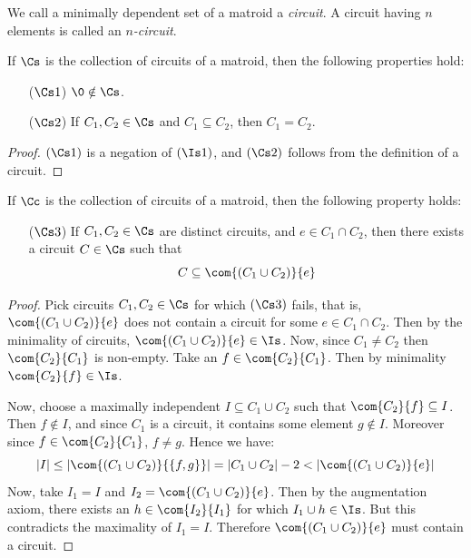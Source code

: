 \begin{definition}
  We call a minimally dependent set of a matroid a \textit{circuit}. A
  circuit having $n$ elements is called an \textit{$n$-circuit}.
\end{definition}

\begin{proposition}\label{proposition_1.1.2}
  If $\Cs$ is the collection of circuits of a matroid, then the
  following properties hold:
  \begin{enumerate}
    \item[($\Cs1$)] $\0 \notin \Cs$.

    \item[($\Cs2$)] If $C_1, C_2 \in \Cs$ and $C_1 \subseteq C_2$,
      then $C_1=C_2$.
  \end{enumerate}
\end{proposition}
\begin{proof}
  $(\Cs1)$ is a negation of $(\Is1)$, and $(\Cs2)$ follows from the
  definition of a circuit.
\end{proof}

\begin{proposition}\label{proposition_1.1.3}
  If $\Cc$ is the collection of circuits of a matroid, then the
  following property holds:
  \begin{enumerate}
    \item[($\Cs3$)] If $C_1,C_2 \in \Cs$ are distinct circuits, and $e
      \in C_1 \cap C_2$, then there exists a circuit $C \in \Cs$ such
      that
      \begin{equation*}
        C \subseteq \com{(C_1 \cup C_2)}{e}
      \end{equation*}
  \end{enumerate}
\end{proposition}
\begin{proof}
  Pick circuits $C_1,C_2 \in \Cs$ for which $(\Cs3)$ fails, that is,
  $\com{(C_1 \cup C_2)}{e}$ does not contain a circuit for some $e \in
  C_1 \cap C_2$. Then by the minimality of circuits, $\com{(C_1 \cup
  C_2)}{e} \in \Is$. Now, since $C_1 \neq C_2$ then $\com{C_2}{C_1}$
  is non-empty. Take an $f \in \com{C_2}{C_1}$. Then by minimality
  $\com{C_2}{f} \in \Is$.

  Now, choose a maximally independent $I \subseteq C_1 \cup C_2$ such
  that $\com{C_2}{f} \subseteq I$. Then $f \notin I$, and since $C_1$
  is a circuit, it contains some element $g \notin I$. Moreover since
  $f \in \com{C_2}{C_1}$, $f \neq g$. Hence we have:
  \begin{equation*}
    |I| \leq |\com{(C_1 \cup C_2)}{\{f,g\}}|=|C_1 \cup C_2|-2<|\com{(C_1 \cup C_2)}{e}|
  \end{equation*}
  Now, take $I_1=I$ and $I_2=\com{(C_1 \cup C_2)}{e}$. Then by the
  augmentation axiom, there exists an $h \in \com{I_2}{I_1}$ for which
  $I_1 \cup h \in \Is$. But this contradicts the maximality of
  $I_1=I$. Therefore $\com{(C_1 \cup C_2)}{e}$ must contain a circuit.
\end{proof}

